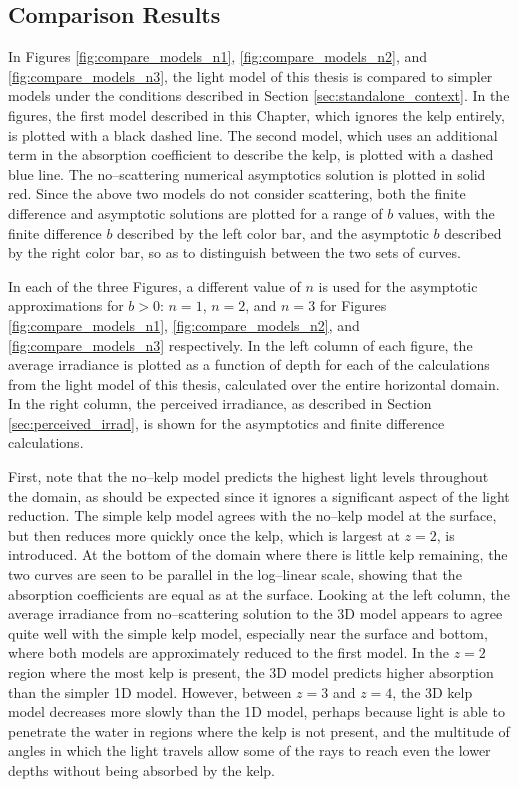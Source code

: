 \documentclass[ms,cpyr,lof,lot]{uathesis}
\begin{document}
\subsection{Comparison Results}
In Figures \ref{fig:compare_models_n1}, \ref{fig:compare_models_n2}, and \ref{fig:compare_models_n3}, the light model of this thesis is compared to simpler models under the conditions described in Section \ref{sec:standalone_context}.
In the figures, the first model described in this Chapter, which ignores the kelp entirely, is plotted with a black dashed line.
The second model, which uses an additional term in the absorption coefficient to describe the kelp, is plotted with a dashed blue line.
The no--scattering numerical asymptotics solution is plotted in solid red.
Since the above two models do not consider scattering, both the finite difference and asymptotic solutions are plotted for a range of $b$ values, with the finite difference $b$ described by the left color bar, and the asymptotic $b$ described by the right color bar, so as to distinguish between the two sets of curves.

In each of the three Figures, a different value of $n$ is used for the asymptotic approximations for $b>0$: $n=1$, $n=2$, and $n=3$ for Figures \ref{fig:compare_models_n1}, \ref{fig:compare_models_n2}, and \ref{fig:compare_models_n3} respectively.
In the left column of each figure, the average irradiance is plotted as a function of depth for each of the calculations from the light model of this thesis, calculated over the entire horizontal domain.
In the right column, the perceived irradiance, as described in Section \ref{sec:perceived_irrad}, is shown for the asymptotics and finite difference calculations.

First, note that the no--kelp model predicts the highest light levels throughout the domain, as should be expected since it ignores a significant aspect of the light reduction.
The simple kelp model agrees with the no--kelp model at the surface, but then reduces more quickly once the kelp, which is largest at $z=2$, is introduced.
At the bottom of the domain where there is little kelp remaining, the two curves are seen to be parallel in the log--linear scale, showing that the absorption coefficients are equal as at the surface.
Looking at the left column, the average irradiance from no--scattering solution to the 3D model appears to agree quite well with the simple kelp model, especially near the surface and bottom, where both models are approximately reduced to the first model.
In the $z=2$ region where the most kelp is present, the 3D model predicts higher absorption than the simpler 1D model.
However, between $z=3$ and $z=4$, the 3D kelp model decreases more slowly than the 1D model, perhaps because light is able to penetrate the water in regions where the kelp is not present, and the multitude of angles in which the light travels allow some of the rays to reach even the lower depths without being absorbed by the kelp.
\end{document}
